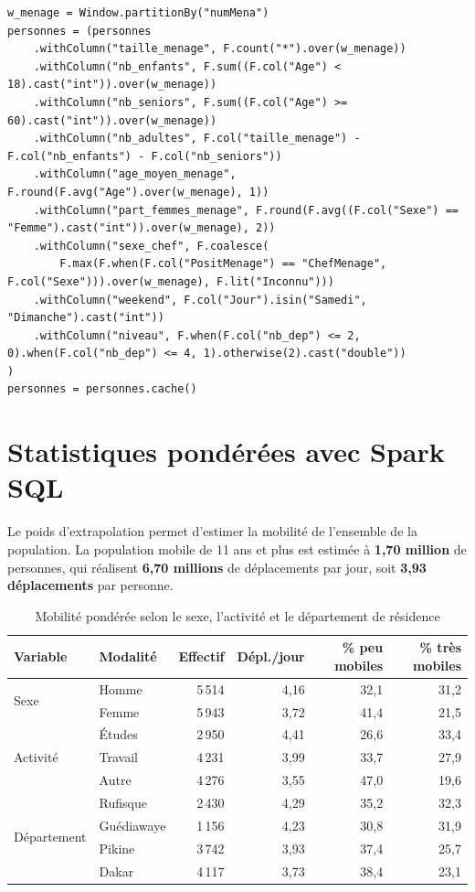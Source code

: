 \documentclass[12pt,a4paper]{report}
\newcommand{\1}{\mathbf{1}}
\begin{document}
\begin{lstlisting}[caption={Variables de ménage calculées par window functions},label={lst:fenetre}]
w_menage = Window.partitionBy("numMena")
personnes = (personnes
    .withColumn("taille_menage", F.count("*").over(w_menage))
    .withColumn("nb_enfants", F.sum((F.col("Age") < 18).cast("int")).over(w_menage))
    .withColumn("nb_seniors", F.sum((F.col("Age") >= 60).cast("int")).over(w_menage))
    .withColumn("nb_adultes", F.col("taille_menage") - F.col("nb_enfants") - F.col("nb_seniors"))
    .withColumn("age_moyen_menage", F.round(F.avg("Age").over(w_menage), 1))
    .withColumn("part_femmes_menage", F.round(F.avg((F.col("Sexe") == "Femme").cast("int")).over(w_menage), 2))
    .withColumn("sexe_chef", F.coalesce(
        F.max(F.when(F.col("PositMenage") == "ChefMenage", F.col("Sexe"))).over(w_menage), F.lit("Inconnu")))
    .withColumn("weekend", F.col("Jour").isin("Samedi", "Dimanche").cast("int"))
    .withColumn("niveau", F.when(F.col("nb_dep") <= 2, 0).when(F.col("nb_dep") <= 4, 1).otherwise(2).cast("double"))
)
personnes = personnes.cache()
\end{lstlisting}

\section{Statistiques pondérées avec Spark SQL}
Le poids d'extrapolation permet d'estimer la mobilité de l'ensemble de la population. La population mobile de 11 ans et plus est estimée à \textbf{1,70 million} de personnes, qui réalisent \textbf{6,70 millions} de déplacements par jour, soit \textbf{3,93 déplacements} par personne.

\begin{table}[H]
\centering
\caption{Mobilité pondérée selon le sexe, l'activité et le département de résidence}\label{tab:ponderees}
\small
\begin{tabular}{@{}llrrrr@{}}
\toprule
\textbf{Variable} & \textbf{Modalité} & \textbf{Effectif} & \textbf{Dépl./jour} & \textbf{\% peu mobiles} & \textbf{\% très mobiles} \\
\midrule
\multirow{2}{*}{Sexe} & Homme & 5\,514 & 4,16 & 32,1 & 31,2 \\
 & Femme & 5\,943 & 3,72 & 41,4 & 21,5 \\
\midrule
\multirow{3}{*}{Activité} & Études & 2\,950 & 4,41 & 26,6 & 33,4 \\
 & Travail & 4\,231 & 3,99 & 33,7 & 27,9 \\
 & Autre & 4\,276 & 3,55 & 47,0 & 19,6 \\
\midrule
\multirow{4}{*}{Département} & Rufisque & 2\,430 & 4,29 & 35,2 & 32,3 \\
 & Guédiawaye & 1\,156 & 4,23 & 30,8 & 31,9 \\
 & Pikine & 3\,742 & 3,93 & 37,4 & 25,7 \\
 & Dakar & 4\,117 & 3,73 & 38,4 & 23,1 \\
\bottomrule
\end{tabular}
\end{table}
\end{document}
